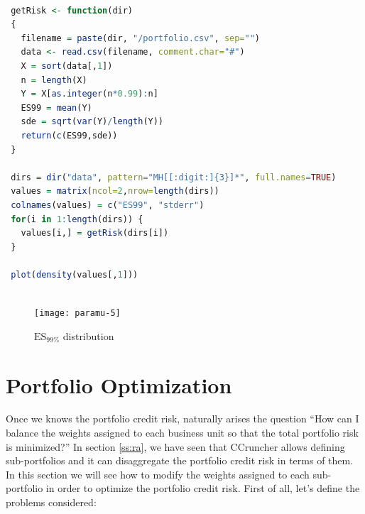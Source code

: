 \documentclass[11pt,fleqn]{book} %
\begin{document}
\begin{lstlisting}[language=R, label={sc:paramu5}, caption={$ES_{99\%}$ distribution (R script)}]

 getRisk <- function(dir)
 {
   filename = paste(dir, "/portfolio.csv", sep="")
   data <- read.csv(filename, comment.char="#")
   X = sort(data[,1])
   n = length(X)
   Y = X[as.integer(n*0.99):n]
   ES99 = mean(Y)
   sde = sqrt(var(Y)/length(Y))
   return(c(ES99,sde))
 }

 dirs = dir("data", pattern="MH[[:digit:]{3}]*", full.names=TRUE)
 values = matrix(ncol=2,nrow=length(dirs))
 colnames(values) = c("ES99", "stderr")
 for(i in 1:length(dirs)) {
   values[i,] = getRisk(dirs[i])
 }
 
 plot(density(values[,1]))
 
\end{lstlisting}

\begin{figure}[!ht]
	\centering
	\texttt{[image: paramu-5]}
	\caption{$\text{ES}_{99\%}$ distribution}
	\label{fig:paramu5}
\end{figure}

\section{Portfolio Optimization}

Once we knows the portfolio credit risk, naturally arises the question ``How 
can I balance the weights assigned to each business unit so that the total 
portfolio risk is minimized?'' In section \ref{ss:ra}, we have seen that 
CCruncher allows defining sub-portfolios and it can disaggregate the portfolio 
credit risk in terms of them. In this section we will see how to modify the 
weights assigned to each sub-portfolio in order to optimize the portfolio
credit risk. First of all, let's define the problems considered:
\end{document}
